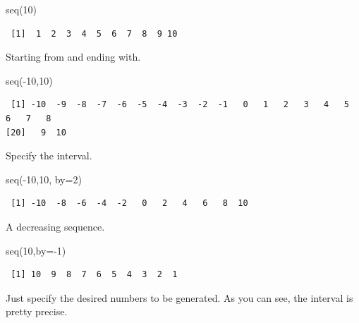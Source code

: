 \documentclass[
  letterpaper,
  DIV=11,
  numbers=noendperiod]{scrreprt}
\newenvironment{Shaded}{\begin{snugshade}}{\end{snugshade}}
\newcommand{\AttributeTok}[1]{\textcolor[rgb]{0.40,0.45,0.13}{#1}}
\newcommand{\DecValTok}[1]{\textcolor[rgb]{0.68,0.00,0.00}{#1}}
\newcommand{\FunctionTok}[1]{\textcolor[rgb]{0.28,0.35,0.67}{#1}}
\newcommand{\NormalTok}[1]{\textcolor[rgb]{0.00,0.23,0.31}{#1}}
\newcommand{\SpecialCharTok}[1]{\textcolor[rgb]{0.37,0.37,0.37}{#1}}
\begin{document}
\begin{Shaded}
\begin{Highlighting}[]
\FunctionTok{seq}\NormalTok{(}\DecValTok{10}\NormalTok{)}
\end{Highlighting}
\end{Shaded}

\begin{verbatim}
 [1]  1  2  3  4  5  6  7  8  9 10
\end{verbatim}

Starting from and ending with.

\begin{Shaded}
\begin{Highlighting}[]
\FunctionTok{seq}\NormalTok{(}\SpecialCharTok{{-}}\DecValTok{10}\NormalTok{,}\DecValTok{10}\NormalTok{)}
\end{Highlighting}
\end{Shaded}

\begin{verbatim}
 [1] -10  -9  -8  -7  -6  -5  -4  -3  -2  -1   0   1   2   3   4   5   6   7   8
[20]   9  10
\end{verbatim}

Specify the interval.

\begin{Shaded}
\begin{Highlighting}[]
\FunctionTok{seq}\NormalTok{(}\SpecialCharTok{{-}}\DecValTok{10}\NormalTok{,}\DecValTok{10}\NormalTok{, }\AttributeTok{by=}\DecValTok{2}\NormalTok{)}
\end{Highlighting}
\end{Shaded}

\begin{verbatim}
 [1] -10  -8  -6  -4  -2   0   2   4   6   8  10
\end{verbatim}

A decreasing sequence.

\begin{Shaded}
\begin{Highlighting}[]
\FunctionTok{seq}\NormalTok{(}\DecValTok{10}\NormalTok{,}\AttributeTok{by=}\SpecialCharTok{{-}}\DecValTok{1}\NormalTok{)}
\end{Highlighting}
\end{Shaded}

\begin{verbatim}
 [1] 10  9  8  7  6  5  4  3  2  1
\end{verbatim}

Just specify the desired numbers to be generated. As you can see, the
interval is pretty precise.
\end{document}
